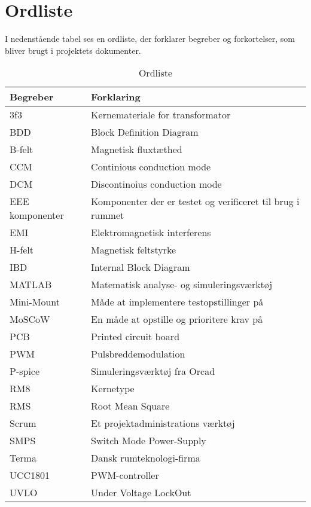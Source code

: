 \section{Ordliste}
I nedenstående tabel ses en ordliste, der forklarer begreber og forkortelser, som bliver brugt i projektets dokumenter.
\begin{table}[H] 			
	\centering
	\begin{tabularx}{\textwidth}{|X|l|} 
		\hline
		\textbf{Begreber} & \textbf{Forklaring} \\ \hline
		3f3 & Kernemateriale for transformator \\ \hline
		BDD & Block Definition Diagram \\ \hline
		B-felt & Magnetisk fluxtæthed \\ \hline
		CCM & Continious conduction mode \\ \hline
		DCM & Discontinoius conduction mode \\ \hline
		EEE komponenter & Komponenter der er testet og verificeret til brug i rummet \\ \hline
		EMI & Elektromagnetisk interferens \\ \hline
		H-felt & Magnetisk feltstyrke \\ \hline
		IBD & Internal Block Diagram \\ \hline
		MATLAB & Matematisk analyse- og simuleringsværktøj \\ \hline
		Mini-Mount & Måde at implementere testopstillinger på \\ \hline
		MoSCoW & En måde at opstille og prioritere krav på \\ \hline
		PCB & Printed circuit board \\ \hline
		PWM & Pulsbreddemodulation \\ \hline
		P-spice & Simuleringsværktøj fra Orcad \\ \hline
		RM8 & Kernetype \\ \hline
		RMS & Root Mean Square \\ \hline
		Scrum & Et projektadministrations værktøj \\ \hline
		SMPS & Switch Mode Power-Supply \\ \hline
		Terma & Dansk rumteknologi-firma  \\ \hline
		UCC1801 & PWM-controller \\ \hline
		UVLO & Under Voltage LockOut \\ \hline
	\end{tabularx}
	
	\caption{Ordliste}
	\label{tab:ucc1801_specs}
\end{table}

